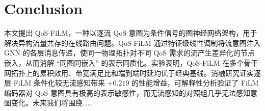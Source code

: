 \section{Conclusion}
\label{sec:conclusion}
本文提出 QoS-FiLM，一种以逐流 QoS 意图为条件信号的图神经网络架构，用于解决异构流量共存的在线路由问题。QoS-FiLM 通过特征级线性调制将流意图注入 GNN 的各层消息传递，使同一物理拓扑对不同 QoS 需求的流产生差异化的节点嵌入，从而消解 ``同图同嵌入'' 的表示同质化。实验表明，QoS-FiLM 在多个骨干网拓扑上的累积效用、带宽满足比和端到端时延均优于经典基线。消融研究证实逐层 FiLM 条件化较无流感知带来 $+0.219$ 的性能增益，可解释性分析验证了 FiLM 编码器对 QoS 意图具有极高的表示敏感性，而无流感知的对照组几乎无法感知意图变化。未来我们将围绕……